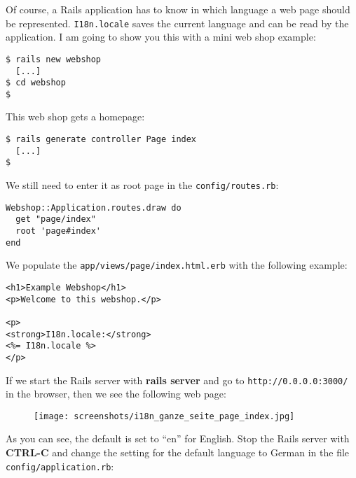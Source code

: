 \documentclass[a4paper]{book}
\begin{document}
Of course, a Rails application has to know in which language a web page should be represented. \texttt{I18n.locale} saves the current language and can be read by the application. I am going to show you this with a mini web shop example:

\begin{shaded}\begin{verbatim}
$ rails new webshop
  [...]
$ cd webshop
$
\end{verbatim}\end{shaded}

This web shop gets a homepage:

\begin{shaded}\begin{verbatim}
$ rails generate controller Page index
  [...]
$
\end{verbatim}\end{shaded}

We still need to enter it as root page in the \texttt{config/routes.rb}:

\begin{shaded}\begin{verbatim}
Webshop::Application.routes.draw do
  get "page/index"
  root 'page#index'
end
\end{verbatim}\end{shaded}

We populate the \texttt{app/views/page/index.html.erb} with the following example:

\begin{shaded}\begin{verbatim}
<h1>Example Webshop</h1>
<p>Welcome to this webshop.</p>

<p>
<strong>I18n.locale:</strong>
<%= I18n.locale %>
</p>
\end{verbatim}\end{shaded}

If we start the Rails server with \textbf{rails server} and go to \texttt{http://0.0.0.0:3000/} in the browser, then we see the following web page:

\begin{figure}[htbp]
\centering
\texttt{[image: screenshots/i18n\_ganze\_seite\_page\_index.jpg]}
\end{figure}

As you can see, the default is set to “en” for English. Stop the Rails server with \textbf{CTRL-C} and change the setting for the default language to German in the file \texttt{config/application.rb}:
\end{document}
